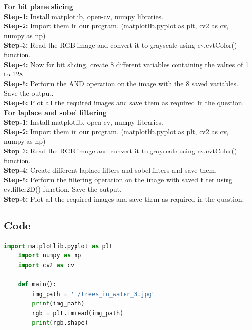 \documentclass{article}
\begin{document}
{    \textbf{For bit plane slicing}\\
    \textbf{Step-1:}
    Install matplotlib, open-cv, numpy libraries.\\
    \textbf{Step-2:}
    Import them in our program. (matplotlib.pyplot as plt, cv2 as cv, numpy as np)\\
    \textbf{Step-3:}
    Read the RGB image and convert it to grayscale using cv.cvtColor() function.\\
    \textbf{Step-4:}
    Now for bit slicing, create 8 different variables containing the values of 1 to 128.\\
    \textbf{Step-5:}
    Perform the AND operation on the image with the 8 saved variables. Save the output.\\
    \textbf{Step-6:}
    Plot all the required images and save them as required in the question.\\
    
    \textbf{For laplace and sobel filtering}\\
    \textbf{Step-1:}
    Install matplotlib, open-cv, numpy libraries.\\
    \textbf{Step-2:}
    Import them in our program. (matplotlib.pyplot as plt, cv2 as cv, numpy as np)\\
    \textbf{Step-3:}
    Read the RGB image and convert it to grayscale using cv.cvtColor() function.\\
    \textbf{Step-4:}
    Create different laplace filters and sobel filters and save them.\\
    \textbf{Step-5:}
    Perform the filtering operation on the image with saved filter using cv.filter2D() function. Save the output.\\
    \textbf{Step-6:}
    Plot all the required images and save them as required in the question.\\
    
    \subsection{Code}
    \lstset{style=mystyle}
    \begin{lstlisting}[language=Python, caption=Code for binary masking a grayscale image]
    import matplotlib.pyplot as plt
    import numpy as np
    import cv2 as cv
    
    def main():
        img_path = './trees_in_water_3.jpg'
        print(img_path)
        rgb = plt.imread(img_path)
        print(rgb.shape)
    

\end{lstlisting}}
\end{document}
